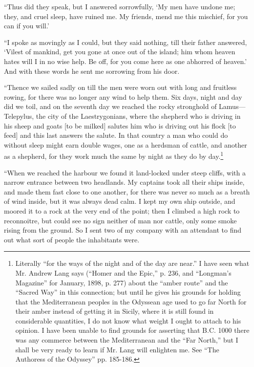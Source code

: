 “Thus did they speak, but I answered sorrowfully, ‘My men have undone me; they,
and cruel sleep, have ruined me. My friends, mend me this mischief, for you can
if you will.’

“I spoke as movingly as I could, but they said nothing, till their father
answered, ‘Vilest of mankind, get you gone at once out of the island; him whom
heaven hates will I in no wise help. Be off, for you come here as one abhorred
of heaven.’ And with these words he sent me sorrowing from his door.

“Thence we sailed sadly on till the men were worn out with long and fruitless
rowing, for there was no longer any wind to help them. Six days, night and day
did we toil, and on the seventh day we reached the rocky stronghold of
Lamus—Telepylus, the city of the Laestrygonians, where the shepherd who is
driving in his sheep and goats [to be milked] salutes him who is driving out
his flock [to feed] and this last answers the salute. In that country a man who
could do without sleep might earn double wages, one as a herdsman of cattle,
and another as a shepherd, for they work much the same by night as they do by
day.\footnote{Literally “for the ways of the night and of the day are near.” I have seen
what Mr. Andrew Lang says (“Homer and the Epic,” p. 236, and “Longman’s
Magazine” for January, 1898, p. 277) about the “amber route” and the “Sacred
Way” in this connection; but until he gives his grounds for holding that the
Mediterranean peoples in the Odyssean age used to go far North for their amber
instead of getting it in Sicily, where it is still found in considerable
quantities, I do not know what weight I ought to attach to his opinion. I have
been unable to find grounds for asserting that B.C. 1000 there was any
commerce between the Mediterranean and the “Far North,” but I shall be very
ready to learn if Mr. Lang will enlighten me. See “The Authoress of the
Odyssey” pp. 185-186.}

“When we reached the harbour we found it land-locked under steep cliffs, with a
narrow entrance between two headlands. My captains took all their ships inside,
and made them fast close to one another, for there was never so much as a
breath of wind inside, but it was always dead calm. I kept my own ship outside,
and moored it to a rock at the very end of the point; then I climbed a high
rock to reconnoitre, but could see no sign neither of man nor cattle, only some
smoke rising from the ground. So I sent two of my company with an attendant to
find out what sort of people the inhabitants were.

